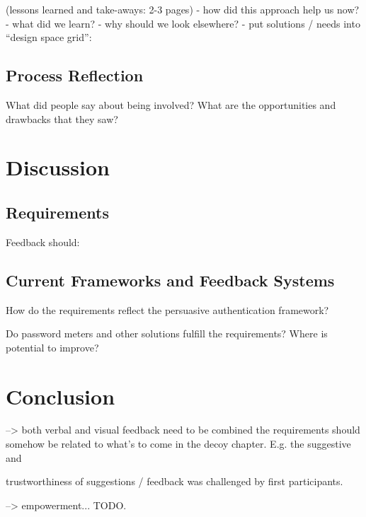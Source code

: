 (lessons learned and take-aways: 2-3 pages)
- how did this approach help us now?
- what did we learn?
- why should we look elsewhere?
- put solutions / needs into ``design space grid'':



\subsection{Process Reflection}
What did people say about being involved? What are the opportunities and drawbacks that they saw?
	
\section{Discussion}

\subsection{Requirements}
Feedback should:



\subsection{Current Frameworks and Feedback Systems}
How do the requirements reflect the persuasive authentication framework?

Do password meters and other solutions fulfill the requirements?
Where is potential to improve?



\section{Conclusion}



--> both verbal and visual feedback need to be combined
the requirements should somehow be related to what's to come in the decoy chapter. E.g. the suggestive and 

trustworthiness of suggestions / feedback was challenged by first participants.




--> empowerment... TODO.


\vspace*{1cm}\noindent
{}


